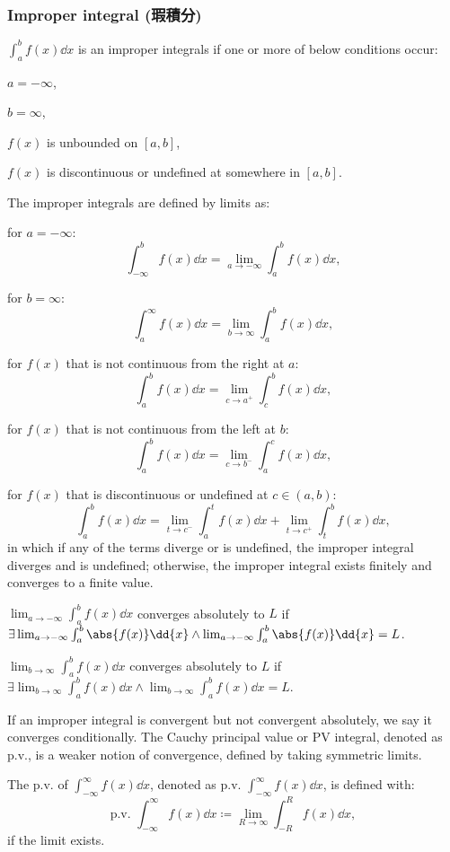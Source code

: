 \documentclass[a4paper,12pt]{report}
\begin{document}
\subsubsection{Improper integral (瑕積分)}
$\int _{a}^{b}f(x)\dd{x}$ is an improper integrals if one or more of below conditions occur:
\ben
\item $a=-\infty$,
\item $b=\infty$,
\item $f(x)$ is unbounded on $[a,b]$,
\item $f(x)$ is discontinuous or undefined at somewhere in $[a,b]$.
\een

The improper integrals are defined by limits as:
\bit
\item for $a=-\infty$:
\[\int _{-\infty }^bf(x)\dd{x}=\lim _{a\to -\infty }\int _{a}^{b}f(x)\dd{x},\]
\item for $b=\infty$:
\[\int _{a}^{\infty }f(x)\dd{x}=\lim _{b\to \infty }\int _{a}^{b}f(x)\dd{x},\]
\item for $f(x)$ that is not continuous from the right at $a$:
\[\int_a^bf(x)\dd{x}=\lim_{c\to a^+}\int_c^bf(x)\dd{x},\]
\item for $f(x)$ that is not continuous from the left at $b$:
\[\int_a^bf(x)\dd{x}=\lim_{c\to b^-}\int_a^cf(x)\dd{x},\]
\item for $f(x)$ that is discontinuous or undefined at $c\in(a,b)$:
\[\int _{a}^{b}f(x)\dd{x}=\lim_{t\to c^-}\int _{a}^{t}f(x)\dd{x}+\lim_{t\to c^+}\int _{t}^{b}f(x)\dd{x},\]
\eit
in which if any of the terms diverge or is undefined, the improper integral diverges and is undefined; otherwise, the improper integral exists finitely and converges to a finite value.

$\lim _{a\to -\infty }\int _{a}^{b}f(x)\dd{x}$ converges absolutely to $L$ if $\exists\lim _{a\to -\infty }\int _{a}^{b}\abs{f(x)}\dd{x}\land\lim _{a\to -\infty }\int _{a}^{b}\abs{f(x)}\dd{x}=L$.

$\lim _{b\to \infty }\int _{a}^{b}f(x)\dd{x}$ converges absolutely to $L$ if $\exists\lim _{b\to \infty }\int _{a}^{b}f(x)\dd{x}\land\lim _{b\to \infty }\int _{a}^{b}f(x)\dd{x}=L$.

If an improper integral is convergent but not convergent absolutely, we say it converges conditionally.
The Cauchy principal value or PV integral, denoted as p.v., is a weaker notion of convergence, defined by taking symmetric limits. 

The p.v. of $\int _{-\infty}^{\infty}f(x)\dd{x}$, denoted as $\text{p.v.\ }\int_{-\infty}^{\infty} f(x)\dd{x}$, is defined with:
\[\text{p.v.\ }\int_{-\infty}^{\infty} f(x)\dd{x}\coloneq\lim_{R\to\infty} \int_{-R}^{R} f(x)\dd{x},\]
if the limit exists.
\end{document}
